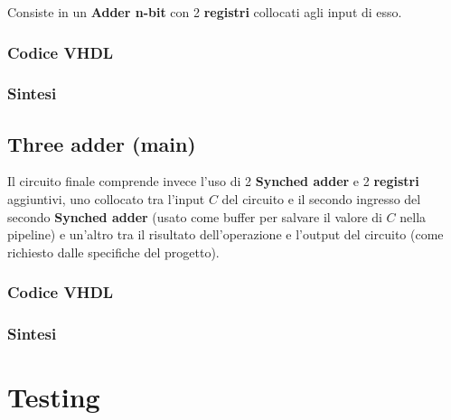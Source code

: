 \documentclass[12pt]{article}
\begin{document}
        Consiste in un \textbf{Adder n-bit} con 2 \textbf{registri} collocati agli input di esso.

        \subsubsection{Codice VHDL}
            
        
        \subsubsection{Sintesi}

    \subsection{Three adder (main)}
        Il circuito finale comprende invece l'uso di 2 \textbf{Synched adder} e 2 \textbf{registri} aggiuntivi, uno collocato tra l'input $C$ del circuito e il secondo ingresso del secondo \textbf{Synched adder} (usato come buffer per salvare il valore di $C$ nella pipeline) e un'altro tra il risultato dell'operazione e l'output del circuito (come richiesto dalle specifiche del progetto).

        \subsubsection{Codice VHDL}
            
        
        \subsubsection{Sintesi}

\section{Testing}
\end{document}
